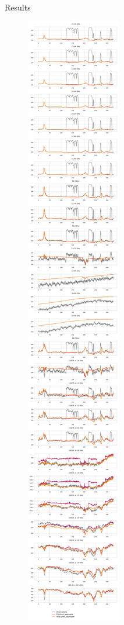 \documentclass[final,hyperref={pdfpagelabels=false}]{beamer}
\begin{document}
\begin{frame}
\begin{columns}[t]
          
    \begin{column}{.48\linewidth}

      \begin{block}{Results}
            \begin{figure}
            \centering
            \includegraphics[width = \textwidth]{../plots/fit_overview}
            \end{figure}
      \end{block}


\end{column}
\end{columns}
\end{frame}
\end{document}

